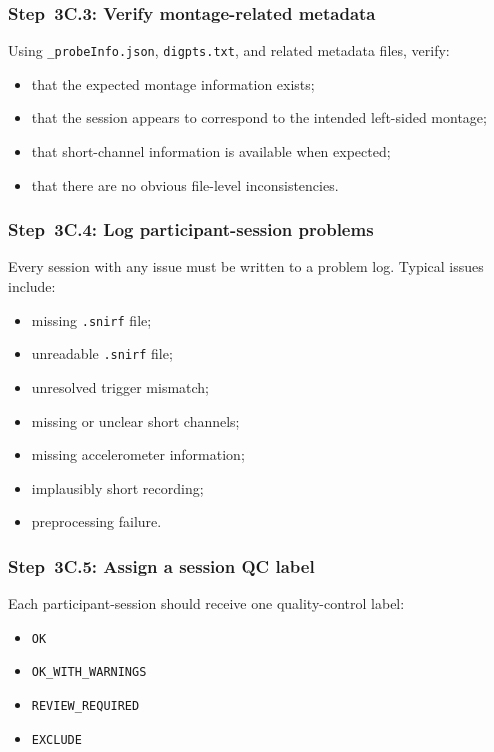 \subsubsection{Step~3C.3: Verify montage-related metadata}
Using \texttt{\_probeInfo.json}, \texttt{digpts.txt}, and related metadata files, verify:
\begin{itemize}
    \item that the expected montage information exists;
    \item that the session appears to correspond to the intended left-sided montage;
    \item that short-channel information is available when expected;
    \item that there are no obvious file-level inconsistencies.
\end{itemize}

\subsubsection{Step~3C.4: Log participant-session problems}
Every session with any issue must be written to a problem log.
Typical issues include:
\begin{itemize}
    \item missing \texttt{.snirf} file;
    \item unreadable \texttt{.snirf} file;
    \item unresolved trigger mismatch;
    \item missing or unclear short channels;
    \item missing accelerometer information;
    \item implausibly short recording;
    \item preprocessing failure.
\end{itemize}

\subsubsection{Step~3C.5: Assign a session QC label}
Each participant-session should receive one quality-control label:
\begin{itemize}
    \item \texttt{OK}
    \item \texttt{OK\_WITH\_WARNINGS}
    \item \texttt{REVIEW\_REQUIRED}
    \item \texttt{EXCLUDE}
\end{itemize}

